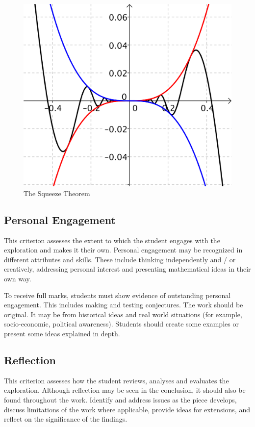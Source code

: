 \documentclass[11pt, letterpaper]{article}
\begin{document}
\begin{figure}[H]
	\centering
	\includegraphics[scale=0.5]{limit}
	\caption{The Squeeze Theorem \cite{DBHS2}}
	\label{fig:squeeze} %
\end{figure}

\subsection{Personal Engagement}
This criterion assesses the extent to which the student engages with the exploration and makes it their own. 
Personal engagement may be recognized in different attributes and skills. These include thinking independently and /
or creatively, addressing personal interest and presenting mathematical ideas in their own way.

To receive full marks, students must show evidence of outstanding personal engagement. This includes making and 
testing conjectures. The work should be original. It may be from historical ideas and real world situations (for 
example, socio-economic, political awareness). Students should create some examples or present some ideas explained 
in depth.

\subsection{Reflection}
This criterion assesses how the student reviews, analyses and evaluates the exploration. Although reflection may be 
seen in the conclusion, it should also be found throughout the work. Identify and address issues as the piece 
develops, discuss limitations of the work where applicable, provide ideas for extensions, and reflect on the 
significance of the findings.
\end{document}
